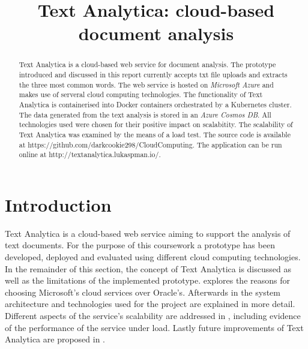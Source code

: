 \documentclass[conference]{IEEEtran}
\begin{document}
\title{Text Analytica: cloud-based document analysis\\}

\author{
\and
{}
}

\maketitle

\begin{abstract}
Text Analytica is a cloud-based web service for document analysis. The prototype introduced and discussed in this report currently accepts txt file uploads and extracts the three most common words. The web service is hosted on \textit{Microsoft Azure} and makes use of serveral cloud computing technologies. The functionality of Text Analytica is containerised into Docker containers orchestrated by a Kubernetes cluster. The data generated from the text analysis is stored in an \textit{Azure Cosmos DB}. All technologies used were chosen for their positive impact on scalabitity. The scalability of Text Analytica was examined by the means of a load test. The source code is available at https://github.com/darkcookie298/CloudComputing. The application can be run online at http://textanalytica.lukaspman.io/.
\end{abstract}

\section{Introduction}
\label{sec:intro}
Text Analytica is a cloud-based web service aiming to support the analysis of text documents. For the purpose of this coursework a prototype has been developed, deployed and evaluated using different cloud computing technologies. In the remainder of this section, the concept of Text Analytica is discussed as well as the limitations of the implemented prototype.  explores the reasons for choosing Microsoft's cloud services over Oracle's. Afterwards in  the system architecture and technologies used for the project are explained in more detail. Different aspects of the service's scalability are addressed in , including evidence of the performance of the service under load. Lastly future improvements of Text Analytica are proposed in .
\end{document}
